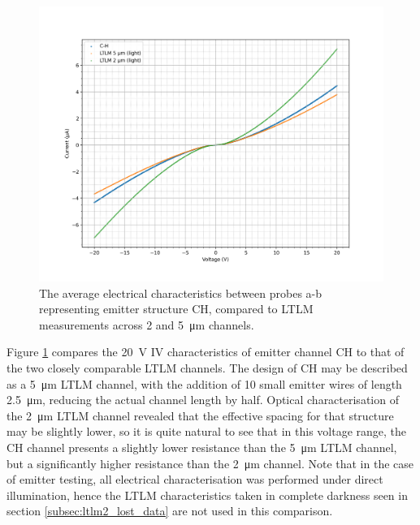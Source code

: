 \begin{refsection}
\begin{figure}[H]
    \centering
    \includegraphics[width=\linewidth]{Chapter7/Figs/Raster/Emitters/20V comparison to LTLM.png}
    \caption{The average electrical characteristics between probes a-b representing emitter structure CH, compared to LTLM measurements across 2 and 5~\si{\micro\metre} channels.}
    \label{fig:e_ch_20v_ltlm}
\end{figure}

Figure \ref{fig:e_ch_20v_ltlm} compares the 20~\si{\volt} IV characteristics of emitter channel CH to that of the two closely comparable LTLM channels. The design of CH may be described as a 5~\si{\micro\metre} LTLM channel, with the addition of 10 small emitter wires of length 2.5~\si{\micro\metre}, reducing the actual channel length by half. Optical characterisation of the 2~\si{\micro\metre} LTLM channel revealed that the effective spacing for that structure may be slightly lower, so it is quite natural to see that in this voltage range, the CH channel presents a slightly lower resistance than the 5~\si{\micro\metre} LTLM channel, but a significantly higher resistance than the 2~\si{\micro\metre} channel. Note that in the case of emitter testing, all electrical characterisation was performed under direct illumination, hence the LTLM characteristics taken in complete darkness seen in section \ref{subsec:ltlm2_lost_data} are not used in this comparison.


\end{refsection}

